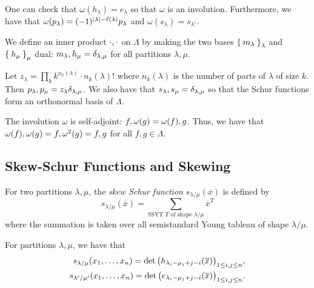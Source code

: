 \documentclass[letterpaper]{article}
\begin{document}
\begin{prop}
  One can check that $\omega(h_\lambda) = e_\lambda$ so that $\omega$ is an involution.
  Furthermore, we have that $\omega(p_\lambda) = (-1)^{\abs{\lambda} - \ell(\lambda)} p_\lambda$ and $\omega(s_\lambda) = s_{\lambda'}$.
\end{prop}

\begin{defn}
  We define an inner product $\inner{\cdot ,\cdot}$ on $\Lambda$ by making the two bases $\Set{m_\lambda}_\lambda$ and $\Set{h_\mu}_\mu$ dual: $\inner{m_\lambda, h_\mu} = \delta_{\lambda, \mu}$ for all partitions $\lambda, \mu$.
\end{defn}

\begin{prop}
  Let $z_\lambda = \prod_{k} k^{n_k(\lambda)} \cdot n_k(\lambda)!$ where $n_k(\lambda)$ is the number of parts of $\lambda$ of size $k$.
  Then $\inner{p_\lambda, p_\mu} = z_\lambda \delta_{\lambda, \mu}$.
  We also have that $\inner{s_\lambda, s_\mu} = \delta_{\lambda, \mu}$ so that the Schur functions form an orthonormal basis of $\Lambda$.
\end{prop}

\begin{prop}
  The involution $\omega$ is self-adjoint: $\inner{f, \omega(g)} = \inner{\omega(f), g}$.
  Thus, we have that $\inner{\omega(f), \omega(g)} = \inner{f, \omega^2(g)} = \inner{f, g}$ for all $f, g \in \Lambda$.
\end{prop}

\subsection{Skew-Schur Functions and Skewing}

\begin{defn}
  For two partitions $\lambda, \mu$, the \emph{skew Schur function} $s_{\lambda / \mu}(\overline{x})$ is defined by
  \[
    s_{\lambda / \mu}(\overline{x}) = \sum_{\text{SSYT } T \text{ of shape } \lambda / \mu} \overline{x}^T
  \]
  where the summation is taken over all semistandard Young tableau of shape $\lambda / \mu$.
\end{defn}

\begin{prop}
  For partitions $\lambda, \mu$, we have that
  \begin{align*}
    s_{\lambda / \mu}(x_1, \ldots, x_n) = \det\pqty{h_{\lambda_i - \mu_j + j - i}(\overline{x})}_{1 \leq i, j \leq n}, \\
    s_{\lambda' / \mu'}(x_1, \ldots, x_n) = \det\pqty{e_{\lambda_i - \mu_j + j - i}(\overline{x})}_{1 \leq i, j \leq n}.
  \end{align*}
\end{prop}
\end{document}
